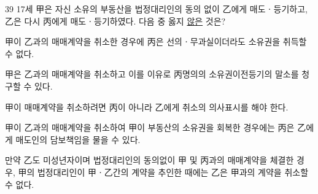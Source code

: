 \begin{question}{39}
17세 甲은 자신 소유의 부동산을 법정대리인의 동의 없이 乙에게 매도ㆍ등기하고, 乙은 다시 丙에게 매도ㆍ등기하였다. 다음 중 옳지 \uline{않은} 것은?
\begin{choices}
  \item 甲이 乙과의 매매계약을 취소한 경우에 丙은 선의ㆍ무과실이더라도 소유권을 취득할 수 없다.
  \item 甲은 乙과의 매매계약을 취소하고 이를 이유로 丙명의의 소유권이전등기의 말소를 청구할 수 있다.
  \item 甲이 매매계약을 취소하려면 丙이 아니라 乙에게 취소의 의사표시를 해야 한다.
  \item 甲이 乙과의 매매계약을 취소하여 甲이 부동산의 소유권을 회복한 경우에는 丙은 乙에게 매도인의 담보책임을 물을 수 있다.
  \item 만약 乙도 미성년자이며 법정대리인의 동의없이 甲 및 丙과의 매매계약을 체결한 경우, 甲의 법정대리인이 甲ㆍ乙간의 계약을 추인한 때에는 乙은 甲과의 계약을 취소할 수 없다.
\end{choices}
\end{question}

